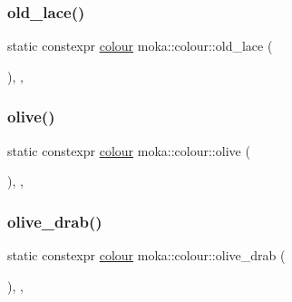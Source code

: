 \subsubsection{\texorpdfstring{old\_lace()}{old\_lace()}}
{\footnotesize\ttfamily static constexpr \mbox{\hyperlink{classmoka_1_1colour}{colour}} moka\+::colour\+::old\+\_\+lace (\begin{DoxyParamCaption}{ }\end{DoxyParamCaption})\hspace{0.3cm}{\ttfamily [inline]}, {\ttfamily [static]}, {\ttfamily [noexcept]}}

\mbox{\label{classmoka_1_1colour_abecfd112bd69cfe1bab12859666df631}} 
\subsubsection{\texorpdfstring{olive()}{olive()}}
{\footnotesize\ttfamily static constexpr \mbox{\hyperlink{classmoka_1_1colour}{colour}} moka\+::colour\+::olive (\begin{DoxyParamCaption}{ }\end{DoxyParamCaption})\hspace{0.3cm}{\ttfamily [inline]}, {\ttfamily [static]}, {\ttfamily [noexcept]}}

\mbox{\label{classmoka_1_1colour_a94992b07e270d1c1fe68e335257bd273}} 
\subsubsection{\texorpdfstring{olive\_drab()}{olive\_drab()}}
{\footnotesize\ttfamily static constexpr \mbox{\hyperlink{classmoka_1_1colour}{colour}} moka\+::colour\+::olive\+\_\+drab (\begin{DoxyParamCaption}{ }\end{DoxyParamCaption})\hspace{0.3cm}{\ttfamily [inline]}, {\ttfamily [static]}, {\ttfamily [noexcept]}}

\mbox{\label{classmoka_1_1colour_a7c6fc079f1689c2e47d698b913d16a07}} 
